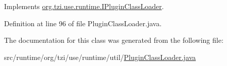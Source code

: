 Implements \hyperlink{interfaceorg_1_1tzi_1_1use_1_1runtime_1_1_i_plugin_class_loader_a4ce9a892243007bc18dba3f43ab7fed9}{org.\-tzi.\-use.\-runtime.\-I\-Plugin\-Class\-Loader}.



Definition at line 96 of file Plugin\-Class\-Loader.\-java.



The documentation for this class was generated from the following file\-:\begin{DoxyCompactItemize}
\item 
src/runtime/org/tzi/use/runtime/util/\hyperlink{_plugin_class_loader_8java}{Plugin\-Class\-Loader.\-java}\end{DoxyCompactItemize}
